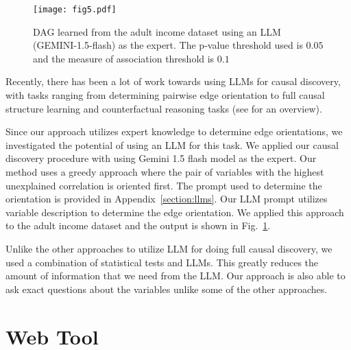 \documentclass{uai2025} %
\begin{document}
\begin{figure}[t!]
	\centering
	\texttt{[image: fig5.pdf]}
	\caption{DAG learned from the adult income dataset using an LLM (GEMINI-1.5-flash) as the expert. The p-value threshold used is $ 0.05 $ and the measure of association threshold is $ 0. 1 $}
	\label{fig:adult_llm}
\end{figure}
Recently, there has been a lot of work towards using LLMs for causal discovery,
with tasks ranging from determining pairwise edge orientation
\citep{Kiciman2023, Jin2024} to full causal structure learning \citep{Naik2023,
Vashishtha2023} and counterfactual reasoning tasks\citep{Kiciman2023} (see
\citet{Liu2024} for an overview).

Since our approach utilizes expert knowledge to determine edge orientations, we
investigated the potential of using an LLM for this task. We applied our causal
discovery procedure with using Gemini 1.5 flash model as the expert. Our method
uses a greedy approach where the pair of variables with the highest unexplained
correlation is oriented first. The prompt used to determine the orientation is
provided in Appendix~\ref{section:llms}. Our LLM prompt utilizes variable
description to determine the edge orientation. We applied this approach to the
adult income dataset and the output is shown in Fig.~\ref{fig:adult_llm}. 

Unlike the other approaches to utilize LLM for doing full causal discovery, we 
used a combination of statistical tests and LLMs. This greatly reduces the
amount of information that we need from the LLM. Our approach is also able to 
ask exact questions about the variables unlike some of the other approaches.

\section{Web Tool}
\label{sec:web}
\end{document}
